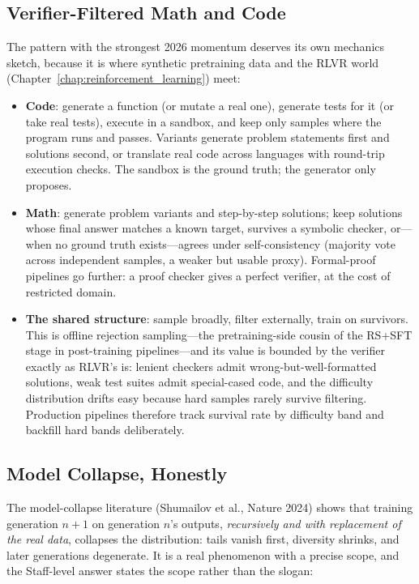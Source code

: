 \subsection{Verifier-Filtered Math and Code}

The pattern with the strongest 2026 momentum deserves its own mechanics sketch, because it is where synthetic pretraining data and the RLVR world (Chapter~\ref{chap:reinforcement_learning}) meet:

\begin{itemize}
    \item \textbf{Code}: generate a function (or mutate a real one), generate tests for it (or take real tests), execute in a sandbox, and keep only samples where the program runs and passes. Variants generate problem statements first and solutions second, or translate real code across languages with round-trip execution checks. The sandbox is the ground truth; the generator only proposes.
    \item \textbf{Math}: generate problem variants and step-by-step solutions; keep solutions whose final answer matches a known target, survives a symbolic checker, or---when no ground truth exists---agrees under self-consistency (majority vote across independent samples, a weaker but usable proxy). Formal-proof pipelines go further: a proof checker gives a perfect verifier, at the cost of restricted domain.
    \item \textbf{The shared structure}: sample broadly, filter externally, train on survivors. This is offline rejection sampling---the pretraining-side cousin of the RS+SFT stage in post-training pipelines---and its value is bounded by the verifier exactly as RLVR's is: lenient checkers admit wrong-but-well-formatted solutions, weak test suites admit special-cased code, and the difficulty distribution drifts easy because hard samples rarely survive filtering. Production pipelines therefore track survival rate by difficulty band and backfill hard bands deliberately.
\end{itemize}

\subsection{Model Collapse, Honestly}

The model-collapse literature (Shumailov et al., Nature 2024) shows that training generation $n{+}1$ on generation $n$'s outputs, \textit{recursively and with replacement of the real data}, collapses the distribution: tails vanish first, diversity shrinks, and later generations degenerate. It is a real phenomenon with a precise scope, and the Staff-level answer states the scope rather than the slogan:

